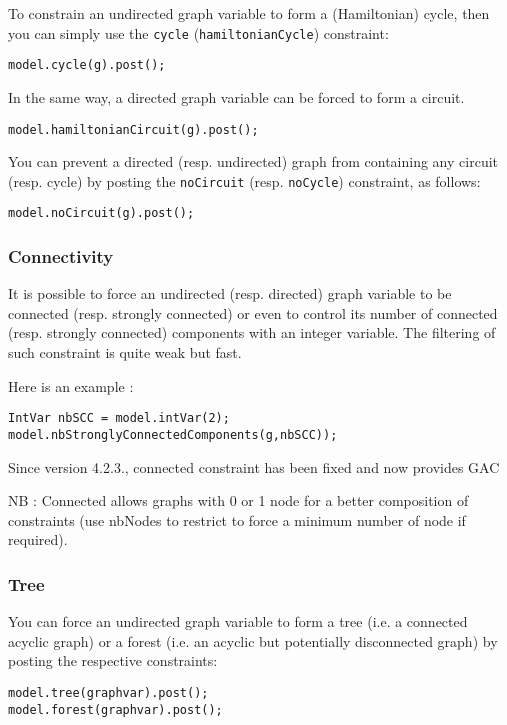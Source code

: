 \documentclass{article}
\begin{document}
To constrain an undirected graph variable to form a (Hamiltonian) cycle, then you can simply use the \texttt{cycle} (\texttt{hamiltonianCycle}) constraint: 
\begin{lstlisting}
model.cycle(g).post();
\end{lstlisting} 
In the same way, a directed graph variable can be forced to form a circuit.
\begin{lstlisting}
model.hamiltonianCircuit(g).post();
\end{lstlisting} 

You can prevent a directed (resp. undirected) graph from containing any circuit (resp. cycle) by posting the \texttt{noCircuit} (resp. \texttt{noCycle}) constraint, as follows:
\begin{lstlisting}
model.noCircuit(g).post();
\end{lstlisting}


\subsubsection{Connectivity}

It is possible to force an undirected (resp. directed) graph variable to be connected (resp. strongly connected) \cite{Tarjan72} or even to control its number of connected (resp. strongly connected) components with an integer variable. The filtering of such constraint is quite weak but fast. 

Here is an example :
\begin{lstlisting}
IntVar nbSCC = model.intVar(2);
model.nbStronglyConnectedComponents(g,nbSCC));
\end{lstlisting}

{\color{blue}Since version 4.2.3., connected constraint has been fixed and now provides GAC}

{\color{blue}NB : Connected allows graphs with 0 or 1 node for a better composition of constraints (use nbNodes to restrict to force a minimum number of node if required).}

\subsubsection{Tree}

You can force an undirected graph variable to form a tree (i.e. a connected acyclic graph) or a forest (i.e. an acyclic but potentially disconnected graph) by posting the respective constraints: 
\begin{lstlisting}
model.tree(graphvar).post();
model.forest(graphvar).post();
\end{lstlisting}
\end{document}
